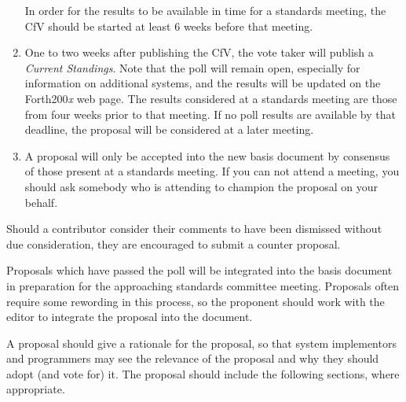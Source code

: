 \begin{enumerate}
	In order for the results to be available in time for a standards
	meeting, the CfV should be started at least 6 weeks before that
	meeting.

\item
	One to two weeks after publishing the CfV, the vote taker will
	publish a \emph{Current Standings}.  Note that the poll will remain
	open, especially for information on additional systems, and the
	results will be updated on the Forth200\emph{x} web page.  The
	results considered at a standards meeting are those from four weeks
	prior to that meeting.  If no poll results are available by that
	deadline, the proposal will be considered at a later meeting.

\item
	A proposal will only be accepted into the new basis document by
	consensus of those present at a standards meeting. If you can
	not attend a meeting, you should ask somebody who is attending
	to champion the proposal on your behalf.
\end{enumerate}

Should a contributor consider their comments to have been dismissed
without due consideration, they are encouraged to submit a counter
proposal.

Proposals which have passed the poll will be integrated into the basis
document in preparation for the approaching standards committee meeting.
Proposals often require some rewording in this process, so the proponent
should work with the editor to integrate the proposal into the document.

A proposal should give a rationale for the proposal, so that system
implementors and programmers may see the relevance of the proposal and
why they should adopt (and vote for) it. The proposal should include
the following sections, where appropriate.

